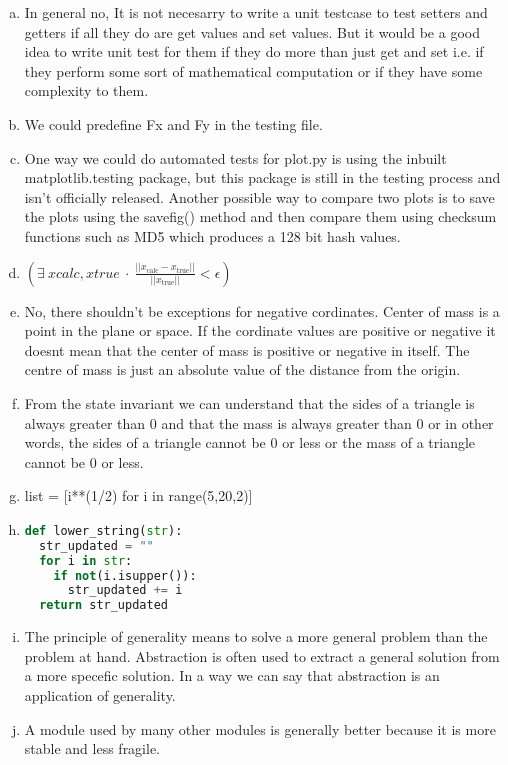 \documentclass[12pt]{article}
\begin{document}
\begin{enumerate}[a)]

\item In general no, It is not necesarry to write a unit testcase to test setters and getters if all they do are get values and set values. But it would be a good idea to write unit test for them if they do more than just get and set i.e. if they perform some sort of mathematical computation or if they have some complexity to them.

\item We could predefine Fx and Fy in the testing file.

\item One way we could do automated tests for plot.py is using the inbuilt matplotlib.testing package, but this package is still in the testing process and isn't officially released. Another possible way to compare two plots is to save the plots using the savefig() method and then compare them using checksum functions such as MD5 which produces a 128 bit hash values.

\item $(\exists \  xcalc, xtrue \ \cdot \  \frac{|| x_\text{calc} - x_\text{true} ||} {||x_\text{true}||} < \epsilon \label{Eq_calcError})$

\item No, there shouldn't be exceptions for negative cordinates. Center of mass is a point in the plane or space. If the cordinate values are positive or negative  it doesnt mean that the center of mass is positive or negative in itself. The centre of mass is just an absolute value of the distance from the origin. 

\item From the state invariant we can understand that the sides of a triangle is always greater than 0 and that the mass is always greater than 0 or in other words, the sides of a triangle cannot
be 0 or less or the mass of a triangle cannot be 0 or less.

\item list = [i**(1/2) for i in range(5,20,2)]

\item \begin{lstlisting}[language=Python]
def lower_string(str):
  str_updated = ""
  for i in str:
    if not(i.isupper()):
      str_updated += i
  return str_updated
\end{lstlisting}

\item The principle of generality means to solve a more general problem than the problem at hand. Abstraction is often used to extract a general solution from a more specefic solution. In
a way we can say that abstraction is an application of generality.

\item A module used by many other modules is generally better because it is more stable and less fragile.

\end{enumerate}
\end{document}
